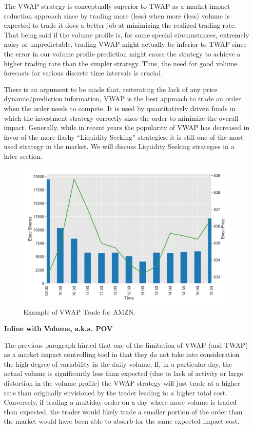 The VWAP strategy is conceptually superior to TWAP as a market impact reduction approach since by trading more (less) when more  (less) volume is expected to trade it does a better job at minimizing the realized trading rate. That being said if the volume profile is, for some special circumstances, extremely noisy or unpredictable, trading VWAP might actually be inferior to TWAP since the error in our volume profile prediction might cause the strategy to achieve a higher trading rate than the simpler strategy. Thus, the need for good volume forecasts for various discrete time intervals is crucial.


There is an argument to be made that, reiterating the lack of any price dynamic/prediction information, VWAP is the best approach to trade an order when the order needs to compete. It is used by quantitatively driven funds in which the investment strategy correctly sizes the order to minimize the overall impact. Generally, while in recent years the popularity of VWAP has decreased in favor of the more flashy ``Liquidity Seeking'' strategies, it is still one of the most used strategy in the market. We will discuss Liquidity Seeking strategies in a later section. \twomedskip


        \begin{figure}[!ht]
        \centering
        \includegraphics[width=\textwidth]{chapters/chapter_exec_models/figures/vwap.png} 
        \caption{Example of VWAP Trade for AMZN. \label{fig:vwap}}
        \end{figure}


\noindent\textbf{Inline with Volume, a.k.a. POV} \twomedskip


The previous paragraph hinted that one of the limitation of VWAP (and TWAP) as a market impact controlling tool in that they do not take into consideration the high degree of variability in the daily volume. If, in a particular day, the actual volume is significantly less than expected (due to lack of activity or large distortion in the volume profile) the VWAP strategy will just trade at a higher rate than originally envisioned by the trader leading to a higher total cost. Conversely, if trading a multiday order on a day where more volume is traded than expected, the trader would likely trade a smaller portion of the order than the market would have been able to absorb for the same expected impact cost.


